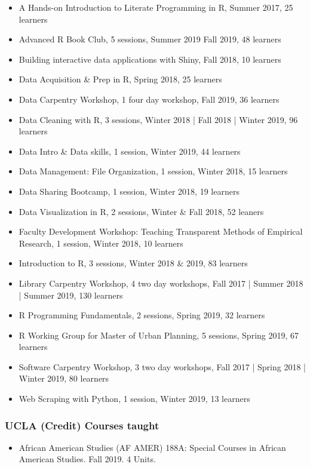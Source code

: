 \begin{itemize}[label={}]
  \item A Hands-on Introduction to Literate Programming in R, Summer 2017, 25 learners
  \item Advanced R Book Club, 5 sessions, Summer 2019 \textbar Fall 2019,	48 learners
  \item Building interactive data applications with Shiny, Fall 2018,	10 learners
  \item Data Acquisition \& Prep in R, Spring 2018, 25 learners
  \item Data Carpentry Workshop, 1 four day workshop, Fall 2019,	36 learners
  \item Data Cleaning with R,	3 sessions,	Winter 2018 | Fall 2018 | Winter 2019, 96 learners
  \item Data Intro \& Data skills, 1 session, Winter 2019,	44 learners
  \item Data Management: File Organization,	1 session, Winter 2018,	15 learners
  \item Data Sharing Bootcamp, 1 session, Winter 2018, 19 learners
  \item Data Visualization in R, 2 sessions, Winter \& Fall 2018, 52 leaners
  \item Faculty Development Workshop: Teaching Transparent Methods of Empirical Research, 1 session, Winter 2018,	10 learners
  \item Introduction to R, 3 sessions, Winter 2018 \& 2019, 83 learners
  \item Library Carpentry Workshop, 4 two day workshops, Fall 2017 | Summer 2018 | Summer 2019, 130 learners
  \item R Programming Fundamentals,	2 sessions,	Spring 2019, 32 learners
  \item R Working Group for Master of Urban Planning, 5 sessions, Spring 2019,	67 learners
  \item Software Carpentry Workshop, 3 two day workshops, Fall 2017 | Spring 2018 | Winter 2019, 80 learners
  \item Web Scraping with Python,	1	session, Winter 2019, 13 learners
\end{itemize}

\subsubsection{UCLA (Credit) Courses taught}

\begin{itemize}[label={}]
    \item African American Studies (AF AMER) 188A: Special Courses in African American Studies. Fall 2019. 4 Units.
\end{itemize}


